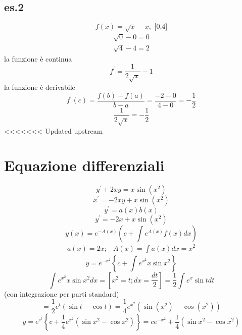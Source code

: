 \documentclass{article}
\begin{document}
\subsection{es.2}
\begin{equation*}
	f(x)=\sqrt{x}-x,\text{ [0,4]}
\end{equation*}
\begin{equation*}
	\begin{matrix}
		\sqrt{0}-0=0\\
		\sqrt{4}-4=2
	\end{matrix}
\end{equation*}
la funzione è continua
\begin{equation*}
	f^\prime=\frac{1}{2\sqrt{x}}-1
\end{equation*}
la funzione è derivabile
\begin{equation*}
	f^\prime(c)=\frac{f(b)-f(a)}{b-a}=\frac{-2-0}{4-0}=-\frac{1}{2}
\end{equation*}
\begin{equation*}
	\boxed{\frac{1}{2\sqrt{x}}=-\frac{1}{2}}
\end{equation*}
<<<<<<< Updated upstream
\section{Equazione differenziali}
\begin{equation*}
	y^\prime+2xy=x\sin(x^2)
\end{equation*}
\begin{equation*}
	x^\prime=-2xy+x\sin(x^2)
\end{equation*}
\begin{equation*}
	y^\prime=a(x)b(x)
\end{equation*}
\begin{equation*}
	y^\prime=-2x+x\sin(x^2)
\end{equation*}
\begin{equation*}
	y(x)=e^{-A(x)}\left(c+\int e^{A(x)}f(x)dx\right)
\end{equation*}
\begin{equation*}
	\begin{matrix}
		a(x)=2x;&A(x)=\int a(x)dx=x^2
	\end{matrix}
\end{equation*}
\begin{equation}
	y=e^{-x^2}\left\{c+\int e^{x^2}x\sin x^2\right\}
\end{equation}
\begin{equation}
	\int e^{x^2}x\sin x^2dx=\left[x^2=t;dx=\frac{dt}{2}\right]=\frac{1}{2}\int e^x\sin tdt
\end{equation}
(con integrazione per parti standard)
\begin{equation}
	=\frac{1}{2}e^t(\sin t-\cos t)=\frac{1}{4}e^{x^2}(\sin(x^2)-\cos(x^2))
\end{equation}
\begin{equation*}
	y=e^{e^t}\left\{c+\frac{1}{4}e^{x^2}(\sin x^2-\cos x^2)\right\}=ce^{-x^2}+\frac{1}{4}(\sin x^2-\cos x^2)
\end{equation*}
\end{document}
